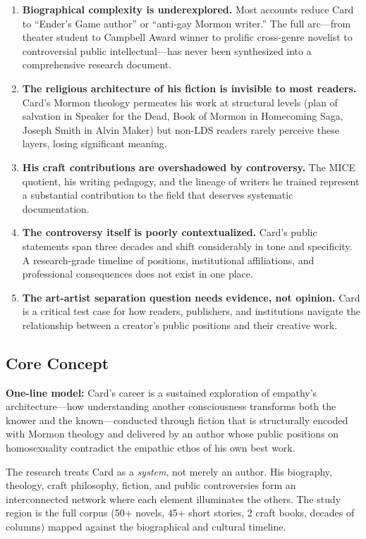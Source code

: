 \documentclass[11pt,letterpaper]{article}
\begin{document}
\begin{enumerate}[leftmargin=2em]
  \item \textbf{Biographical complexity is underexplored.} Most accounts reduce Card to ``Ender's Game author'' or ``anti-gay Mormon writer.'' The full arc---from theater student to Campbell Award winner to prolific cross-genre novelist to controversial public intellectual---has never been synthesized into a comprehensive research document.
  \item \textbf{The religious architecture of his fiction is invisible to most readers.} Card's Mormon theology permeates his work at structural levels (plan of salvation in Speaker for the Dead, Book of Mormon in Homecoming Saga, Joseph Smith in Alvin Maker) but non-LDS readers rarely perceive these layers, losing significant meaning.
  \item \textbf{His craft contributions are overshadowed by controversy.} The MICE quotient, his writing pedagogy, and the lineage of writers he trained represent a substantial contribution to the field that deserves systematic documentation.
  \item \textbf{The controversy itself is poorly contextualized.} Card's public statements span three decades and shift considerably in tone and specificity. A research-grade timeline of positions, institutional affiliations, and professional consequences does not exist in one place.
  \item \textbf{The art-artist separation question needs evidence, not opinion.} Card is a critical test case for how readers, publishers, and institutions navigate the relationship between a creator's public positions and their creative work.
\end{enumerate}

\subsection{Core Concept}

\begin{quotebox}
\textbf{One-line model:} Card's career is a sustained exploration of empathy's architecture---how understanding another consciousness transforms both the knower and the known---conducted through fiction that is structurally encoded with Mormon theology and delivered by an author whose public positions on homosexuality contradict the empathic ethos of his own best work.
\end{quotebox}

The research treats Card as a \textit{system}, not merely an author. His biography, theology, craft philosophy, fiction, and public controversies form an interconnected network where each element illuminates the others. The study region is the full corpus (50+ novels, 45+ short stories, 2 craft books, decades of columns) mapped against the biographical and cultural timeline.
\end{document}
